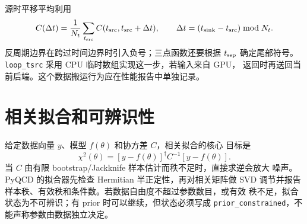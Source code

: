 \documentclass[UTF8,11pt,oneside]{ctexbook}
\begin{document}
源时平移平均利用
\begin{equation}
 C(\Delta t)=\frac1{N_t}\sum_{t_{\rm src}}
 C(t_{\rm src},t_{\rm src}+\Delta t),\qquad
 \Delta t=(t_{\rm sink}-t_{\rm src})\bmod N_t.
\end{equation}
反周期边界在跨过时间边界时引入负号；三点函数还要根据 \(t_{\rm sep}\)
确定尾部符号。\texttt{loop\_tsrc} 采用 CPU 临时数组实现这一步，若输入来自 GPU，
返回时再送回当前后端。这个数据搬运行为应在性能报告中单独记录。

\section{相关拟合和可辨识性}
给定数据向量 \(y\)、模型 \(f(\theta)\) 和协方差 \(C\)，相关拟合的核心
目标是
\begin{equation}
 \chi^2(\theta)=[y-f(\theta)]^\dagger C^{-1}[y-f(\theta)].
 \label{eq:correlated-chi2-clean}
\end{equation}
当 \(C\) 由有限 bootstrap/Jackknife 样本估计而秩不足时，直接求逆会放大
噪声。PyQCD 的拟合器先检查 Hermitian 半正定性，再对相关矩阵做 SVD
调节并报告样本秩、有效秩和条件数。若数据自由度不超过参数数目，或有效
秩不足，拟合状态为不可辨识；有 prior 时可以继续，但状态必须写成
\texttt{prior\_constrained}，不能声称参数由数据独立决定。
\end{document}
